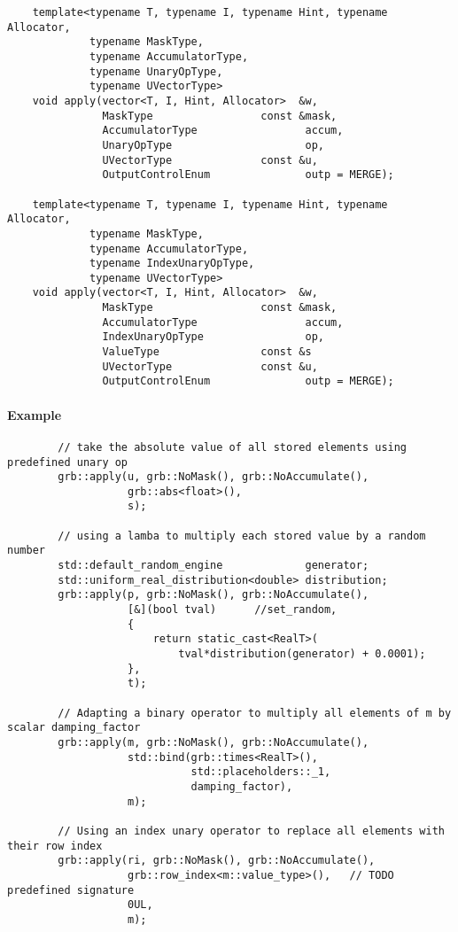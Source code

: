 \begin{verbatim}
    template<typename T, typename I, typename Hint, typename Allocator,
             typename MaskType,
             typename AccumulatorType,
             typename UnaryOpType,
             typename UVectorType>
    void apply(vector<T, I, Hint, Allocator>  &w,
               MaskType                 const &mask,
               AccumulatorType                 accum,
               UnaryOpType                     op,
               UVectorType              const &u,
               OutputControlEnum               outp = MERGE);

    template<typename T, typename I, typename Hint, typename Allocator,
             typename MaskType,
             typename AccumulatorType,
             typename IndexUnaryOpType,
             typename UVectorType>
    void apply(vector<T, I, Hint, Allocator>  &w,
               MaskType                 const &mask,
               AccumulatorType                 accum,
               IndexUnaryOpType                op,
               ValueType                const &s
               UVectorType              const &u,
               OutputControlEnum               outp = MERGE);
\end{verbatim}


\paragraph{Example}

\begin{verbatim}
        // take the absolute value of all stored elements using predefined unary op
        grb::apply(u, grb::NoMask(), grb::NoAccumulate(),
                   grb::abs<float>(),
                   s);

        // using a lamba to multiply each stored value by a random number
        std::default_random_engine             generator;
        std::uniform_real_distribution<double> distribution;
        grb::apply(p, grb::NoMask(), grb::NoAccumulate(),
                   [&](bool tval)      //set_random,
                   {
                       return static_cast<RealT>(
                           tval*distribution(generator) + 0.0001);
                   },
                   t);

        // Adapting a binary operator to multiply all elements of m by scalar damping_factor
        grb::apply(m, grb::NoMask(), grb::NoAccumulate(),
                   std::bind(grb::times<RealT>(),
                             std::placeholders::_1,
                             damping_factor),
                   m);
                   
        // Using an index unary operator to replace all elements with their row index
        grb::apply(ri, grb::NoMask(), grb::NoAccumulate(),
                   grb::row_index<m::value_type>(),   // TODO predefined signature 
                   0UL,
                   m);
\end{verbatim}

